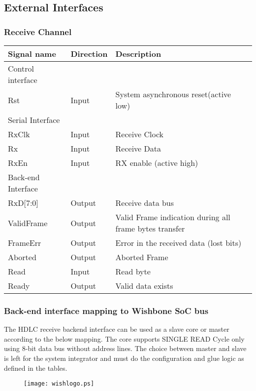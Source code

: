\documentclass[a4paper,11pt]{article}
\begin{document}
\subsection{External Interfaces}
 
\subsubsection{Receive Channel}
 
\begin{tabular}{|l|l|l|}
\hline
Signal name& Direction& Description\\
\hline
\hline
Control interface & & \\
\hline
\hline
Rst & Input & System asynchronous reset(active low)\\
\hline
\hline
Serial Interface & & \\
\hline
\hline
RxClk & Input & Receive Clock\\
Rx & Input& Receive Data\\
RxEn & Input & RX enable (active high)\\
\hline
\hline
Back-end Interface & &\\
\hline
\hline
RxD[7:0]& Output& Receive data bus\\
ValidFrame& Output& Valid Frame indication during all frame bytes transfer\\
FrameErr& Output& Error in the received data (lost bits)\\
Aborted& Output& Aborted Frame\\
Read& Input& Read byte\\
Ready& Output& Valid data exists\\
\hline
\end{tabular}
 
\subsubsection{Back-end interface mapping to Wishbone SoC bus}
The HDLC receive backend interface can be used as a slave core or master according to the below mapping. The core supports SINGLE READ Cycle only using 8-bit data bus without address lines. The choice between master and slave is left for the system integrator and must do the configuration and glue logic as defined in the tables.  
 
\begin{figure}[!h]
\texttt{[image: wishlogo.ps]}
\label{Logo}
\end{figure}
 
\end{document}
